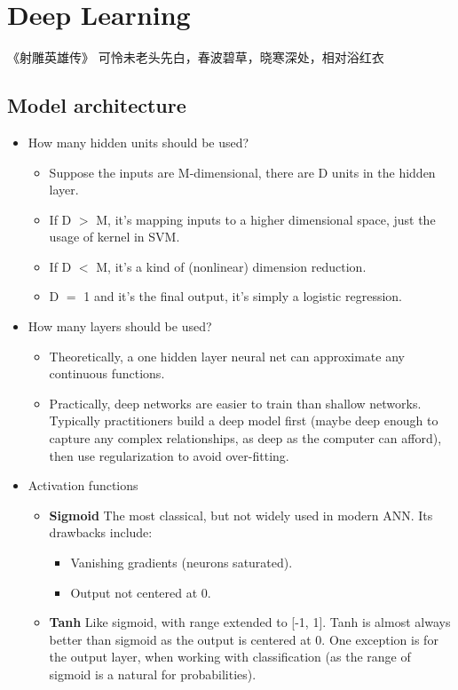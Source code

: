 \chapter{Deep Learning}
\label{chap: deeplearning}
\begin{chapquote}{\kaishu 《射雕英雄传》}
可怜未老头先白，春波碧草，晓寒深处，相对浴红衣
\end{chapquote}

\section{Model architecture}
\label{sec:ma}
\begin{itemize}
\item How many hidden units should be used? 
\begin{itemize}
    \item Suppose the inputs are M-dimensional, there are D units in the hidden layer. 
    \item If D $>$ M, it's mapping inputs to a higher dimensional space, just the usage of kernel in SVM. 
    \item If D $<$ M, it's a kind of (nonlinear) dimension reduction.
    \item D $=$ 1 and it's the final output, it's simply a logistic regression. 
\end{itemize}
\item How many layers should be used?
\begin{itemize}
    \item Theoretically, a one hidden layer neural net can approximate any continuous functions. 
    \item Practically, deep networks are easier to train than shallow networks. Typically practitioners build a deep model first (maybe deep enough to capture any complex relationships, as deep as the computer can afford), then use regularization to avoid over-fitting. 
\end{itemize}
\item Activation functions
\begin{itemize}
    \item \textbf{Sigmoid} The most classical, but not widely used in modern ANN. Its drawbacks include:
    \begin{itemize}
        \item Vanishing gradients (neurons saturated).
        \item Output not centered at 0.
    \end{itemize}
    \item \textbf{Tanh} Like sigmoid, with range extended to [-1, 1]. Tanh is almost always better than sigmoid as the output is centered at 0. One exception is for the output layer, when working with classification (as the range of sigmoid is a natural for probabilities).  

\end{itemize}
\end{itemize}
